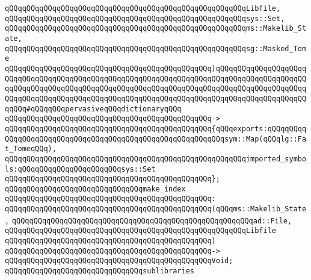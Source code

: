 \verb|qQQqqQQqqQQqqQQqqQQqqQQqqQQqqQQqqQQqqQQqqQQqqQQqqQQqqQQqLibfile,|\newline
\verb|qQQqqQQqqQQqqQQqqQQqqQQqqQQqqQQqqQQqqQQqqQQqqQQqqQQqqQQqsys::Set,|\newline
\verb|qQQqqQQqqQQqqQQqqQQqqQQqqQQqqQQqqQQqqQQqqQQqqQQqqQQqqQQqms::Makelib_State,|\newline
\verb|qQQqqQQqqQQqqQQqqQQqqQQqqQQqqQQqqQQqqQQqqQQqqQQqqQQqqQQqsg::Masked_Tome|\newline
\verb|qQQqqQQqqQQqqQQqqQQqqQQqqQQqqQQqqQQqqQQqqQQqqQQq)qQQqqQQqqQQqqQQqqQQqqQQqqQQqqQQqqQQqqQQqqQQqqQQqqQQqqQQqqQQqqQQqqQQqqQQqqQQqqQQqqQQqqQQqqQQqqQQqqQQqqQQqqQQqqQQqqQQqqQQqqQQqqQQqqQQqqQQqqQQqqQQqqQQqqQQqqQQqqQQqqQQqqQQqqQQqqQQqqQQqqQQqqQQqqQQqqQQqqQQqqQQqqQQqqQQqqQQqqQQqqQQqqQQqqQQqqQQq#qQQqqQQqpervasiveqQQqdictionaryqQQq|\newline
\verb|qQQqqQQqqQQqqQQqqQQqqQQqqQQqqQQqqQQqqQQqqQQqqQQq->|\newline
\verb|qQQqqQQqqQQqqQQqqQQqqQQqqQQqqQQqqQQqqQQqqQQqqQQq{qQQqexports:qQQqqQQqqQQqqQQqqQQqqQQqqQQqqQQqqQQqqQQqqQQqqQQqqQQqqQQqqQQqsym::Map(qQQqlg::Fat_TomeqQQq),|\newline
\verb|qQQqqQQqqQQqqQQqqQQqqQQqqQQqqQQqqQQqqQQqqQQqqQQqqQQqqQQqimported_symbols:qQQqqQQqqQQqqQQqqQQqqQQqsys::Set|\newline
\verb|qQQqqQQqqQQqqQQqqQQqqQQqqQQqqQQqqQQqqQQqqQQqqQQq};|\newline
\newline
\newline
\verb|qQQqqQQqqQQqqQQqqQQqqQQqqQQqqQQqmake_index|\newline
\verb|qQQqqQQqqQQqqQQqqQQqqQQqqQQqqQQqqQQqqQQqqQQqqQQq:|\newline
\verb|qQQqqQQqqQQqqQQqqQQqqQQqqQQqqQQqqQQqqQQqqQQqqQQq(qQQqms::Makelib_State,|\newline
\verb|qQQqqQQqqQQqqQQqqQQqqQQqqQQqqQQqqQQqqQQqqQQqqQQqqQQqqQQqad::File,|\newline
\verb|qQQqqQQqqQQqqQQqqQQqqQQqqQQqqQQqqQQqqQQqqQQqqQQqqQQqqQQqLibfile|\newline
\verb|qQQqqQQqqQQqqQQqqQQqqQQqqQQqqQQqqQQqqQQqqQQqqQQq)|\newline
\verb|qQQqqQQqqQQqqQQqqQQqqQQqqQQqqQQqqQQqqQQqqQQqqQQq->|\newline
\verb|qQQqqQQqqQQqqQQqqQQqqQQqqQQqqQQqqQQqqQQqqQQqqQQqVoid;|\newline
\newline
\newline
\verb|qQQqqQQqqQQqqQQqqQQqqQQqqQQqqQQqsublibraries|\newline
